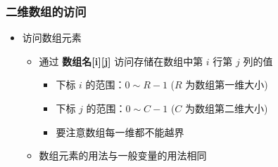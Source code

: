 \begin{frame}[fragile]
    \frametitle{二维数组的访问}

    \begin{itemize}
        \item 访问数组元素

            \begin{itemize}
                \item 通过 \textbf{数组名[i][j]} 访问存储在数组中第 $i$ 行第 $j$ 列的值

                    \begin{itemize}
                        \item 下标 $i$ 的范围：$0 \sim R - 1$ ($R$ 为数组第一维大小)
                        \item 下标 $j$ 的范围：$0 \sim C - 1$ ($C$ 为数组第二维大小)
                        \item 要注意数组每一维都不能越界
                    \end{itemize}

                \item 数组元素的用法与一般变量的用法相同
            \end{itemize}

    \end{itemize}
\end{frame}

